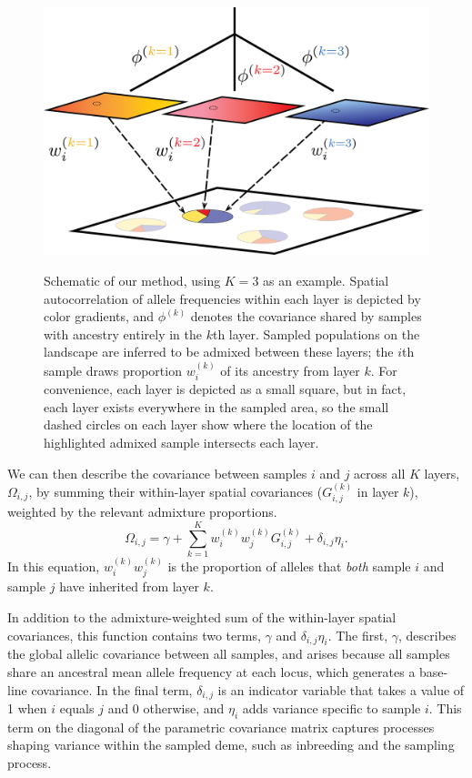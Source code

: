 \documentclass[10pt,letterpaper]{article}
\begin{document}
\begin{figure}
	\centering
		{\includegraphics[width=\textwidth]{figs/schematic/method_schematic.png}}
		\caption{Schematic of our method, using $K=3$ as an example.
                 Spatial autocorrelation of allele frequencies within each layer is depicted by color gradients, 
			     and $\phi^{(k)}$ denotes the covariance shared by samples with ancestry entirely in the $k$th layer.
			     Sampled populations on the landscape are inferred to be admixed between these layers; 
			     the $i$th sample draws proportion $w^{(k)}_i$ of its ancestry from layer $k$.
			     For convenience, each layer is depicted as a small square, but in fact, 
			     each layer exists everywhere in the sampled area,
			     so the small dashed circles on each layer show where 
			     the location of the highlighted admixed sample intersects each layer.
			    }\label{schematic}
\end{figure}

We can then describe the covariance between samples $i$ and $j$ across all $K$ layers, $\Omega_{i,j}$,
by summing their within-layer spatial covariances ($G_{i,j}^{(k)}$ in layer $k$),
weighted by the relevant admixture proportions.
\begin{equation}
    \Omega_{i,j} = \gamma + \sum_{k=1}^K w^{(k)}_i w^{(k)}_j
G^{(k)}_{i,j} + \delta_{i,j}\eta_i .
\label{cross_layer_covariance}
\end{equation}
In this equation, $w^{(k)}_i w^{(k)}_j$ is the proportion of alleles that \emph{both}
sample $i$ and sample $j$ have inherited from layer $k$.

In addition to the admixture-weighted sum of the within-layer spatial covariances,
this function contains two terms, $\gamma$ and $\delta_{i,j}\eta_i$.
The first, $\gamma$, describes the global allelic covariance between all samples, 
and arises because all samples share an ancestral mean allele frequency at each locus,
which generates a base-line covariance.
In the final term, $\delta_{i,j}$ is an indicator variable that takes a value of 1 when $i$ equals $j$ and 0 otherwise,
and $\eta_i$ adds variance specific to sample $i$.
This term on the diagonal of the parametric covariance matrix captures processes shaping variance within the sampled deme, 
such as inbreeding and the sampling process.
\end{document}
